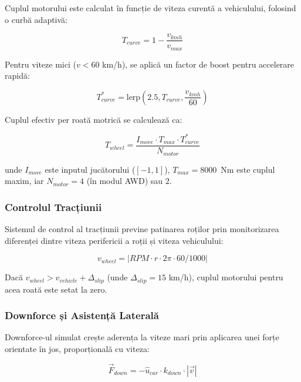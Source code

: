 \documentclass[11pt,twocolumn]{article}
\begin{document}
Cuplul motorului este calculat în funcție de viteza curentă a vehiculului, folosind o curbă adaptivă:

\begin{equation}
    T_{curve} = 1 - \frac{v_{kmh}}{v_{max}}
\end{equation}

Pentru viteze mici ($v < 60$ km/h), se aplică un factor de boost pentru accelerare rapidă:

\begin{equation}
    T_{curve}^{*} = \text{lerp}\left(2.5, T_{curve}, \frac{v_{kmh}}{60}\right)
\end{equation}

Cuplul efectiv per roată motrică se calculează ca:

\begin{equation}
    T_{wheel} = \frac{I_{move} \cdot T_{max} \cdot T_{curve}^{*}}{N_{motor}}
\end{equation}

unde $I_{move}$ este inputul jucătorului ($[-1, 1]$), $T_{max} = 8000$~Nm este cuplul maxim, iar $N_{motor} = 4$ (în modul AWD) sau $2$.

\subsubsection{Controlul Tracțiunii}

Sistemul de control al tracțiunii previne patinarea roților prin monitorizarea diferenței dintre viteza perifericii a roții și viteza vehiculului:

\begin{equation}
    v_{wheel} = |RPM \cdot r \cdot 2\pi \cdot 60 / 1000|
\end{equation}

Dacă $v_{wheel} > v_{vehicle} + \Delta_{slip}$ (unde $\Delta_{slip} = 15$ km/h), cuplul motorului pentru acea roată este setat la zero.

\subsubsection{Downforce și Asistență Laterală}

Downforce-ul simulat crește aderența la viteze mari prin aplicarea unei forțe orientate în jos, proporțională cu viteza:

\begin{equation}
    \vec{F}_{down} = -\hat{u}_{car} \cdot k_{down} \cdot |\vec{v}|
\end{equation}
\end{document}
